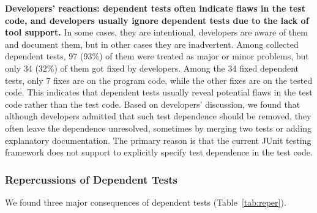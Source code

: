 \vspace{1mm}
\noindent \textbf{{Developers' reactions: dependent tests
often indicate flaws in the test code, and developers usually
ignore dependent tests due to the lack of tool support.}}
In some cases, they are intentional, developers are aware
of them and document them, but in other cases they are
inadvertent. Among \dtnum collected dependent tests,
97 (93\%) of them were treated as major or minor problems,
but only 34 (32\%) of them got fixed by developers. Among
the 34 fixed dependent tests, only 7 fixes are
on the program code, while the other fixes are on the
tested code. This indicates that dependent tests usually
reveal potential flaws in the test code rather than the test code.
Based on developers' discussion, we found that although
developers admitted that such test dependence should be removed,
they often leave the dependence unresolved, sometimes by merging
two tests or adding explanatory documentation.
The primary
reason is that the current JUnit testing framework does not
support to explicitly specify test dependence in the test code.





\subsubsection{Repercussions of Dependent Tests}
\label{sec:repercussion}



We found three major consequences of dependent tests (Table~\ref{tab:reper}).

\vspace{1mm}

